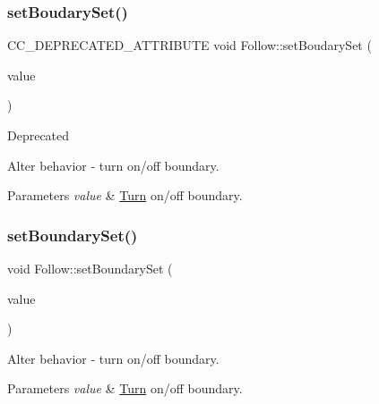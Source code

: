 \subsubsection{\texorpdfstring{set\+Boudary\+Set()}{setBoudarySet()}\hspace{0.1cm}{\footnotesize\ttfamily [2/2]}}
{\footnotesize\ttfamily C\+C\+\_\+\+D\+E\+P\+R\+E\+C\+A\+T\+E\+D\+\_\+\+A\+T\+T\+R\+I\+B\+U\+TE void Follow\+::set\+Boudary\+Set (\begin{DoxyParamCaption}\item[{bool}]{value }\end{DoxyParamCaption})\hspace{0.3cm}{\ttfamily [inline]}}

\begin{DoxyRefDesc}{Deprecated}
\item[\hyperlink{deprecated__deprecated000236}{Deprecated}]Alter behavior -\/ turn on/off boundary. \end{DoxyRefDesc}



\begin{DoxyParams}{Parameters}
{\em value} & \hyperlink{classTurn}{Turn} on/off boundary. \\
\hline
\end{DoxyParams}
\mbox{\label{classFollow_ad01fd1c960695a80e893300d3996bb13}} 
\subsubsection{\texorpdfstring{set\+Boundary\+Set()}{setBoundarySet()}\hspace{0.1cm}{\footnotesize\ttfamily [1/2]}}
{\footnotesize\ttfamily void Follow\+::set\+Boundary\+Set (\begin{DoxyParamCaption}\item[{bool}]{value }\end{DoxyParamCaption})\hspace{0.3cm}{\ttfamily [inline]}}

Alter behavior -\/ turn on/off boundary.


\begin{DoxyParams}{Parameters}
{\em value} & \hyperlink{classTurn}{Turn} on/off boundary. \\
\hline
\end{DoxyParams}
\mbox{\label{classFollow_ad01fd1c960695a80e893300d3996bb13}} 
